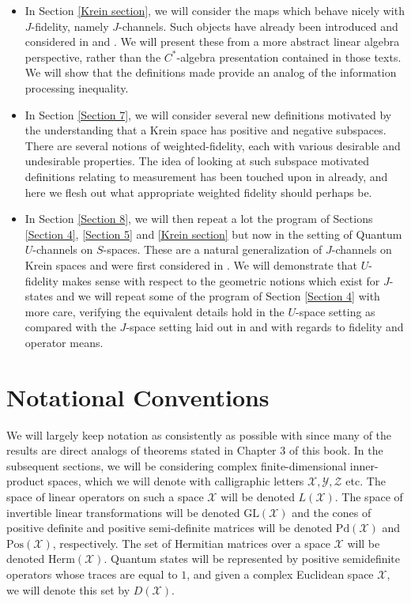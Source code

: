 \documentclass{amsart}
\numberwithin{equation}{section}
\theoremstyle{definition}
\theoremstyle{plain}
\theoremstyle{solutionstyle}
\begin{document}
\begin{itemize}
\item In Section \ref{Krein section}, we will consider the maps which behave nicely with $J$-fidelity, namely $J$-channels. Such objects have already been introduced and considered in \cite{FelipeSosa2022} and \cite{Heo2022}. We will present these from a more abstract linear algebra perspective, rather than the $C^*$-algebra presentation contained in those texts. We will show that the definitions made provide an analog of the information processing inequality. 
\item In Section \ref{Section 7}, we will consider several new definitions motivated by the understanding that a Krein space has positive and negative subspaces. There are several notions of weighted-fidelity, each with various desirable and undesirable properties. The idea of looking at such subspace motivated definitions relating to measurement has been touched upon in \cite{FelipeSosa2022} already, and here we flesh out what appropriate weighted fidelity should perhaps be.
\item In Section \ref{Section 8}, we will then repeat a lot the program of Sections \ref{Section 4}, \ref{Section 5} and \ref{Krein section} but now in the setting of Quantum $U$-channels on $S$-spaces. These are a natural generalization of $J$-channels on Krein spaces and were first considered in \cite{bag2024quantumuchannelssspaces}. We will demonstrate that $U$-fidelity makes sense with respect to the geometric notions which exist for $J$-states and we will repeat some of the program of Section \ref{Section 4} with more care, verifying the equivalent details hold in the $U$-space setting as compared with the $J$-space setting laid out in \cite{franco2026conejhermitianmatricesgeometric} and \cite{Watrous_2018} with regards to fidelity and operator means.  

\end{itemize}

\section{Notational Conventions}\label{Section 3}
We will largely keep notation as consistently as possible with \cite{Watrous_2018} since many of the results are direct analogs of theorems stated in Chapter $3$ of this book. 
In the subsequent sections, we will be considering complex finite-dimensional inner-product spaces, which we will denote with calligraphic letters $\mathcal{X},\mathcal{Y},\mathcal{Z}$ etc. The space of linear operators on such a space $\mathcal{X}$ will be denoted $L(\mathcal{X})$. The space of invertible linear transformations will be denoted $\mathrm{GL}(\mathcal{X})$ and the cones of positive definite and positive semi-definite matrices will be denoted $\mathrm{Pd}(\mathcal{X})$ and $\mathrm{Pos}(\mathcal{X})$, respectively. The set of Hermitian matrices over a space $\mathcal{X}$ will be denoted $\mathrm{Herm}(\mathcal{X})$. Quantum states will be represented by positive semidefinite operators whose traces are equal to $1$, and given a complex Euclidean space $\mathcal{X}$, we will denote this set by $D(\mathcal{X})$. 
\end{document}
